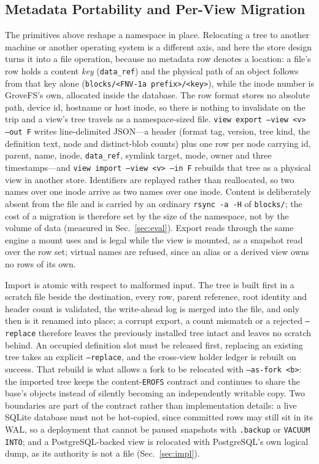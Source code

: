 \documentclass[numberedsection,acmtos]{acmart}
\begin{document}
\subsection{Metadata Portability and Per-View Migration}\label{sec:portability}
The primitives above reshape a namespace in place. Relocating a tree to another
machine or another operating system is a different axis, and here the store
design turns it into a file operation, because no metadata row denotes a
location: a file's row holds a content \emph{key} (\texttt{data\_ref}) and the
physical path of an object follows from that key alone
(\texttt{blocks/\textless FNV-1a prefix\textgreater/\textless key\textgreater}), while the inode number is
GroveFS's own, allocated inside the database. The row format stores no absolute
path, device id, hostname or host inode, so there is nothing to invalidate on
the trip and a view's tree travels as a namespace-sized file.
\texttt{view export --view \textless v\textgreater{} --out F} writes line-delimited JSON---a header
(format tag, version, tree kind, the definition text, node and distinct-blob
counts) plus one row per node carrying id, parent, name, inode,
\texttt{data\_ref}, symlink target, mode, owner and three timestamps---and
\texttt{view import --view \textless v\textgreater{} --in F} rebuilds that tree as a physical view in
another store. Identifiers are replayed rather than reallocated, so two names
over one inode arrive as two names over one inode. Content is deliberately
absent from the file and is carried by an ordinary \texttt{rsync -a -H} of
\texttt{blocks/}; the cost of a migration is therefore set by the size of the
namespace, not by the volume of data (measured in Sec.~\ref{sec:eval}). Export
reads through the same engine a mount uses and is legal while the view is
mounted, as a snapshot read over the row set; virtual names are refused, since
an alias or a derived view owns no rows of its own.

Import is atomic with respect to malformed input. The tree is built first in a
scratch file beside the destination, every row, parent reference, root identity
and header count is validated, the write-ahead log is merged into the file, and
only then is it renamed into place; a corrupt export, a count mismatch or a
rejected \texttt{--replace} therefore leaves the previously installed tree intact
and leaves no scratch behind. An occupied definition slot must be released
first, replacing an existing tree takes an explicit \texttt{--replace}, and the
cross-view holder ledger is rebuilt on success. That rebuild is what allows a
fork to be relocated with \texttt{--as-fork \textless b\textgreater{}}: the imported tree keeps the
content-\texttt{EROFS} contract and continues to share the base's objects
instead of silently becoming an independently writable copy. Two boundaries are
part of the contract rather than implementation details: a live SQLite database
must not be hot-copied, since committed rows may still sit in its WAL, so a
deployment that cannot be paused snapshots with \texttt{.backup} or
\texttt{VACUUM INTO}; and a PostgreSQL-backed view is relocated with
PostgreSQL's own logical dump, as its authority is not a file
(Sec.~\ref{sec:impl}).
\end{document}
